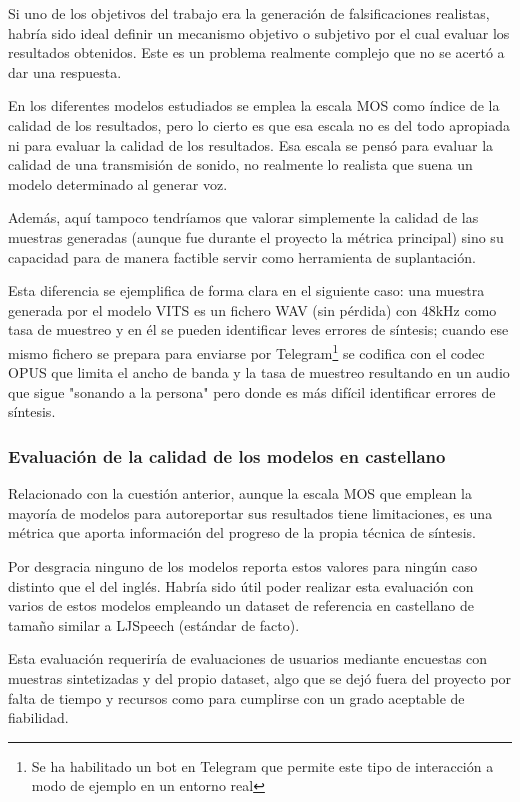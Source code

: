 Si uno de los objetivos del trabajo era la generación de falsificaciones realistas, habría sido ideal definir un mecanismo objetivo o subjetivo por el cual evaluar los resultados obtenidos. Este es un problema realmente complejo que no se acertó a dar una respuesta.

En los diferentes modelos estudiados se emplea la escala MOS como índice de la calidad de los resultados, pero lo cierto es que esa escala no es del todo apropiada ni para evaluar la calidad de los resultados. Esa escala se pensó para evaluar la calidad de una transmisión de sonido, no realmente lo realista que suena un modelo determinado al generar voz.

Además, aquí tampoco tendríamos que valorar simplemente la calidad de las muestras generadas (aunque fue durante el proyecto la métrica principal) sino su capacidad para de manera factible servir como herramienta de suplantación. 

Esta diferencia se ejemplifica de forma clara en el siguiente caso: una muestra generada por el modelo VITS es un fichero WAV (sin pérdida) con 48kHz como tasa de muestreo y en él se pueden identificar leves errores de síntesis; cuando ese mismo fichero se prepara para enviarse por Telegram\footnote{Se ha habilitado un bot en Telegram que permite este tipo de interacción a modo de ejemplo en un entorno real} se codifica con el codec OPUS que limita el ancho de banda y la tasa de muestreo resultando en un audio que sigue "sonando a la persona" pero donde es más difícil identificar errores de síntesis.

\subsubsection{Evaluación de la calidad de los modelos en castellano}

Relacionado con la cuestión anterior, aunque la escala MOS que emplean la mayoría de modelos para autoreportar sus resultados tiene limitaciones, es una métrica que aporta información del progreso de la propia técnica de síntesis.

Por desgracia ninguno de los modelos reporta estos valores para ningún caso distinto que el del inglés. Habría sido útil poder realizar esta evaluación con varios de estos modelos empleando un dataset de referencia en castellano de tamaño similar a LJSpeech (estándar de facto).

Esta evaluación requeriría de evaluaciones de usuarios mediante encuestas con muestras sintetizadas y del propio dataset, algo que se dejó fuera del proyecto por falta de tiempo y recursos como para cumplirse con un grado aceptable de fiabilidad.


